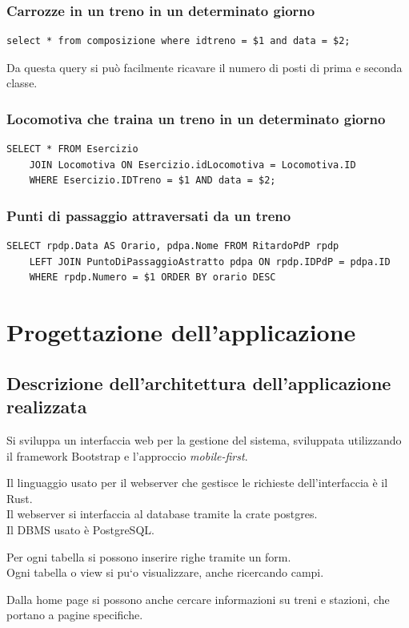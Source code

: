 \documentclass[a4paper,12pt]{report}
\begin{document}
	\subsection{Carrozze in un treno in un determinato giorno}
	\begin{verbatim}
select * from composizione where idtreno = $1 and data = $2;
	\end{verbatim}
	\par Da questa query si può facilmente ricavare il numero di posti di prima e seconda classe.
	\subsection{Locomotiva che traina un treno in un determinato giorno}
	\begin{verbatim}
SELECT * FROM Esercizio
    JOIN Locomotiva ON Esercizio.idLocomotiva = Locomotiva.ID
    WHERE Esercizio.IDTreno = $1 AND data = $2;
	\end{verbatim}
	\subsection{Punti di passaggio attraversati da un treno}
	\begin{verbatim}
SELECT rpdp.Data AS Orario, pdpa.Nome FROM RitardoPdP rpdp
    LEFT JOIN PuntoDiPassaggioAstratto pdpa ON rpdp.IDPdP = pdpa.ID
    WHERE rpdp.Numero = $1 ORDER BY orario DESC
	\end{verbatim}
	\chapter{Progettazione dell'applicazione}
	\section{Descrizione dell'architettura dell'applicazione realizzata}
	\par Si sviluppa un interfaccia web per la gestione del sistema, sviluppata utilizzando il framework Bootstrap e l'approccio \textit{mobile-first}.
	\par Il linguaggio usato per il webserver che gestisce le richieste dell'interfaccia è il Rust.
	\\Il webserver si interfaccia al database tramite la crate postgres.
	\\Il DBMS usato \`e PostgreSQL.
	\par Per ogni tabella si possono inserire righe tramite un form.
	\\Ogni tabella o view si pu`o visualizzare, anche ricercando campi.
	\par Dalla home page si possono anche cercare informazioni su treni e stazioni, che portano a pagine specifiche.
\end{document}
